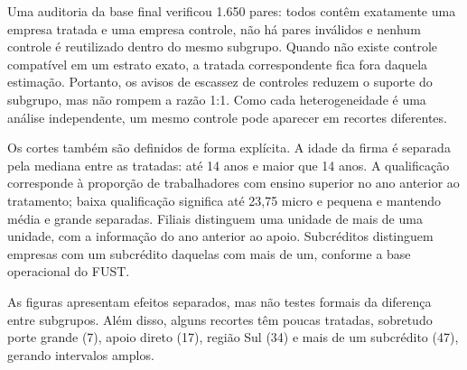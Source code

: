 \documentclass[12pt,a4paper]{article}
\begin{document}
Uma auditoria da base final verificou 1.650 pares: todos contêm exatamente uma empresa tratada e
uma empresa controle, não há pares inválidos e nenhum controle é reutilizado dentro do mesmo
subgrupo. Quando não existe controle compatível em um estrato exato, a tratada correspondente
fica fora daquela estimação. Portanto, os avisos de escassez de controles reduzem o suporte do
subgrupo, mas não rompem a razão 1:1. Como cada heterogeneidade é uma análise independente, um
mesmo controle pode aparecer em recortes diferentes.

Os cortes também são definidos de forma explícita. A idade da firma é separada pela mediana entre
as tratadas: até 14 anos e maior que 14 anos. A qualificação corresponde à proporção de
trabalhadores com ensino superior no ano anterior ao tratamento; baixa qualificação significa até
23,75%
micro e pequena e mantendo média e grande separadas. Filiais distinguem uma unidade de mais de
uma unidade, com a informação do ano anterior ao apoio. Subcréditos distinguem empresas com um
subcrédito daquelas com mais de um, conforme a base operacional do FUST.

As figuras apresentam efeitos separados, mas não testes formais da diferença entre subgrupos.
Além disso, alguns recortes têm poucas tratadas, sobretudo porte grande (7), apoio direto (17),
região Sul (34) e mais de um subcrédito (47), gerando intervalos amplos.
\end{document}
